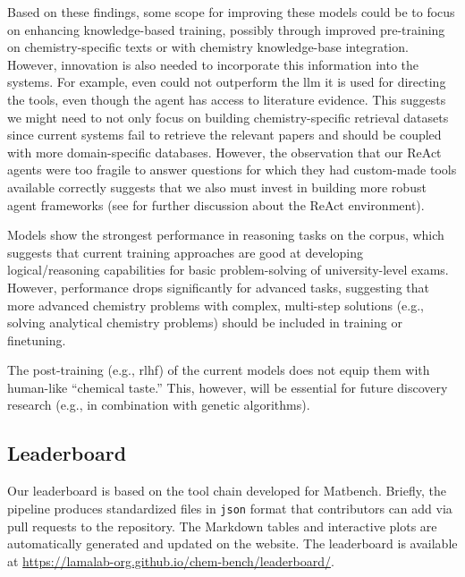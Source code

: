 Based on these findings, some scope for improving these models could be to focus on enhancing knowledge-based training, possibly through improved pre-training on chemistry-specific texts or with chemistry knowledge-base integration. However, innovation is also needed to incorporate this information into the systems. For example, even \PaperQATwo could not outperform the \gls{llm} it is used for directing the tools, even though the agent has access to literature evidence.
This suggests we might need to not only focus on building chemistry-specific retrieval datasets since current systems fail to retrieve the relevant papers and should be coupled with more domain-specific databases. However, the observation that our ReAct agents were too fragile to answer questions for which they had custom-made tools available correctly suggests that we also must invest in building more robust agent frameworks (see  for further discussion about the ReAct environment).

Models show the strongest performance in reasoning tasks on the \chembench corpus, which suggests that current training approaches are good at developing logical/reasoning capabilities for basic problem-solving of university-level exams. However, performance drops significantly for advanced tasks, suggesting that more advanced chemistry problems with complex, multi-step solutions (e.g., solving analytical chemistry problems) should be included in training or finetuning.

The post-training (e.g., \gls{rlhf}) of the current models does not equip them with human-like \enquote{chemical taste.} This, however, will be essential for future discovery research (e.g., in combination with genetic algorithms).

\clearpage
\subsection{Leaderboard}
\label{sec:leaderboard}
Our leaderboard is based on the tool chain developed for Matbench.\autocite{Dunn_2020}
Briefly, the \chembench pipeline produces standardized files in \texttt{json} format that contributors can add via pull requests to the \chembench repository.
The Markdown tables and interactive plots are automatically generated and updated on the \chembench website. The leaderboard is available at \url{https://lamalab-org.github.io/chem-bench/leaderboard/}.

\clearpage

\printnoidxglossary[type=\acronymtype, nonumberlist]  %
